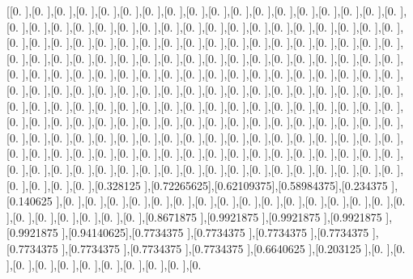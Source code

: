 \documentclass[titlepage]{article}
\begin{document}
[[0.        ],[0.        ],[0.        ],[0.        ],[0.        ],[0.        ],[0.        ],[0.        ],[0.        ],[0.        ],[0.        ],[0.        ],[0.        ],[0.        ],[0.        ],[0.        ],[0.        ],[0.        ],[0.        ],[0.        ],[0.        ],[0.        ],[0.        ],[0.        ],[0.        ],[0.        ],[0.        ],[0.        ],[0.        ],[0.        ],[0.        ],[0.        ],[0.        ],[0.        ],[0.        ],[0.        ],[0.        ],[0.        ],[0.        ],[0.        ],[0.        ],[0.        ],[0.        ],[0.        ],[0.        ],[0.        ],[0.        ],[0.        ],[0.        ],[0.        ],[0.        ],[0.        ],[0.        ],[0.        ],[0.        ],[0.        ],[0.        ],[0.        ],[0.        ],[0.        ],[0.        ],[0.        ],[0.        ],[0.        ],[0.        ],[0.        ],[0.        ],[0.        ],[0.        ],[0.        ],[0.        ],[0.        ],[0.        ],[0.        ],[0.        ],[0.        ],[0.        ],[0.        ],[0.        ],[0.        ],[0.        ],[0.        ],[0.        ],[0.        ],[0.        ],[0.        ],[0.        ],[0.        ],[0.        ],[0.        ],[0.        ],[0.        ],[0.        ],[0.        ],[0.        ],[0.        ],[0.        ],[0.        ],[0.        ],[0.        ],[0.        ],[0.        ],[0.        ],[0.        ],[0.        ],[0.        ],[0.        ],[0.        ],[0.        ],[0.        ],[0.        ],[0.        ],[0.        ],[0.        ],[0.        ],[0.        ],[0.        ],[0.        ],[0.        ],[0.        ],[0.        ],[0.        ],[0.        ],[0.        ],[0.        ],[0.        ],[0.        ],[0.        ],[0.        ],[0.        ],[0.        ],[0.        ],[0.        ],[0.        ],[0.        ],[0.        ],[0.        ],[0.        ],[0.        ],[0.        ],[0.        ],[0.        ],[0.        ],[0.        ],[0.        ],[0.        ],[0.        ],[0.        ],[0.        ],[0.        ],[0.        ],[0.        ],[0.        ],[0.        ],[0.        ],[0.        ],[0.        ],[0.        ],[0.        ],[0.        ],[0.        ],[0.        ],[0.        ],[0.        ],[0.        ],[0.        ],[0.        ],[0.        ],[0.        ],[0.        ],[0.        ],[0.        ],[0.        ],[0.        ],[0.        ],[0.        ],[0.        ],[0.        ],[0.        ],[0.        ],[0.        ],[0.        ],[0.        ],[0.        ],[0.        ],[0.        ],[0.        ],[0.        ],[0.        ],[0.        ],[0.        ],[0.        ],[0.        ],[0.        ],[0.        ],[0.        ],[0.        ],[0.        ],[0.        ],[0.        ],[0.        ],[0.        ],[0.328125  ],[0.72265625],[0.62109375],[0.58984375],[0.234375  ],[0.140625  ],[0.        ],[0.        ],[0.        ],[0.        ],[0.        ],[0.        ],[0.        ],[0.        ],[0.        ],[0.        ],[0.        ],[0.        ],[0.        ],[0.        ],[0.        ],[0.        ],[0.        ],[0.        ],[0.        ],[0.        ],[0.        ],[0.        ],[0.8671875 ],[0.9921875 ],[0.9921875 ],[0.9921875 ],[0.9921875 ],[0.94140625],[0.7734375 ],[0.7734375 ],[0.7734375 ],[0.7734375 ],[0.7734375 ],[0.7734375 ],[0.7734375 ],[0.7734375 ],[0.6640625 ],[0.203125  ],[0.        ],[0.        ],[0.        ],[0.        ],[0.        ],[0.        ],[0.        ],[0.        ],[0.        ],[0.        ],[0.    
\end{document}
